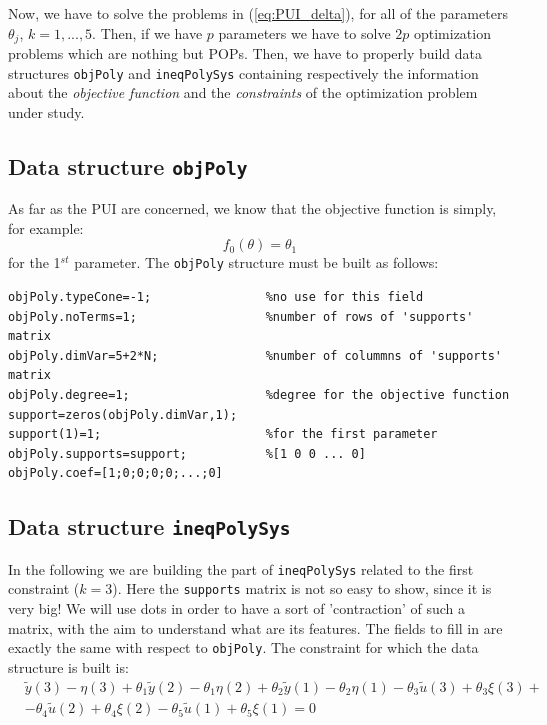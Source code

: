 \noindent
Now, we have to solve the problems in (\ref{eq:PUI_delta}), for all of the parameters $\theta_j$, $k=1,...,5$. Then, if we have $p$ parameters we have to solve $2p$ optimization problems which are nothing but POPs. Then, we have to properly build data structures \texttt{objPoly} and \texttt{ineqPolySys} containing respectively the information about the \textit{objective function} and the \textit{constraints} of the optimization problem under study.

\subsection{Data structure \texttt{objPoly}}
As far as the PUI are concerned, we know that the objective function is simply, for example:
\begin{equation}
    f_0(\theta)=\theta_1
\end{equation} for the 1$^{st}$ parameter. The \texttt{objPoly} structure must be built as follows:
\begin{verbatim}
objPoly.typeCone=-1;                %no use for this field
objPoly.noTerms=1;                  %number of rows of 'supports' matrix
objPoly.dimVar=5+2*N;               %number of colummns of 'supports' matrix
objPoly.degree=1;                   %degree for the objective function
support=zeros(objPoly.dimVar,1);
support(1)=1;                       %for the first parameter
objPoly.supports=support;           %[1 0 0 ... 0]
objPoly.coef=[1;0;0;0;0;...;0]
\end{verbatim}

\subsection{Data structure \texttt{ineqPolySys}}
In the following we are building the part of \texttt{ineqPolySys} related to the first constraint ($k=3$). Here the \texttt{supports} matrix is not so easy to show, since it is very big! We will use dots in order to have a sort of 'contraction' of such a matrix, with the aim to understand what are its features. The fields to fill in are exactly the same with respect to \texttt{objPoly}. The constraint for which the data structure is built is:
\begin{equation}
    \begin{aligned}
        &\tilde{y}(3) - \eta(3) +\theta_1\tilde{y}(2)-\theta_1\eta(2) +\theta_2\tilde{y}(1)-\theta_2\eta(1)-\theta_3\tilde{u}(3)+\theta_3\xi(3)+ \\
            &-\theta_4\tilde{u}(2)+\theta_4\xi(2) -\theta_5\tilde{u}(1)+\theta_5\xi(1)=0
    \end{aligned}
\end{equation}

